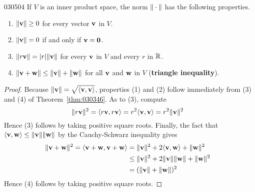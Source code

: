 \begin{theorem}{}{030504}
If $V$ is an inner product space, the norm $\| \cdot \|$ has the following properties.

\begin{enumerate}
\item $\|\textbf{v}\| \geq 0$ for every vector $\textbf{v}$ in $V$.

\item $\|\textbf{v}\| = 0$ if and only if $\textbf{v} = \textbf{0}$.

\item $\| r \textbf{v}\| = |r|\|\textbf{v}\|$ for every $\textbf{v}$ in $V$ and every $r$ in $\mathbb{R}$.

\item $\|\textbf{v} + \textbf{w}\| \leq \|\textbf{v}\| + \|\textbf{w}\|$ for all $\textbf{v}$ and $\textbf{w}$ in $V$ (\textbf{triangle inequality}).

\end{enumerate}
\end{theorem}

\begin{proof}
Because $\| \textbf{v} \| = \sqrt{\langle \textbf{v}, \textbf{v} \rangle}$, properties (1) and (2) follow immediately from (3) and (4) of Theorem~\ref{thm:030346}. As to (3), compute
\begin{equation*}
\| r\textbf{v} \| ^2 = \langle r\textbf{v}, r\textbf{v} \rangle = r^2\langle \textbf{v}, \textbf{v} \rangle = r^2\| \textbf{v} \|^2
\end{equation*}
Hence (3) follows by taking positive square roots. Finally, the fact that $\langle\textbf{v}, \textbf{w}\rangle \leq \|\textbf{v}\|\|\textbf{w}\|$ by the Cauchy-Schwarz inequality gives
\begin{align*}
\| \textbf{v} + \textbf{w} \| ^2 = 
\langle \textbf{v} + \textbf{w}, \textbf{v} + \textbf{w} \rangle &=
\| \textbf{v} \| ^2 + 2 \langle \textbf{v}, \textbf{w} \rangle +
\| \textbf{w} \| ^2 \\
&\leq \| \textbf{v} \| ^2 + 
2 \| \textbf{v} \| \| \textbf{w} \| + 
\| \textbf{w} \| ^2 \\
&= (\| \textbf{v} \| + \| \textbf{w} \|)^2
\end{align*}
Hence (4) follows by taking positive square roots.
\end{proof}

